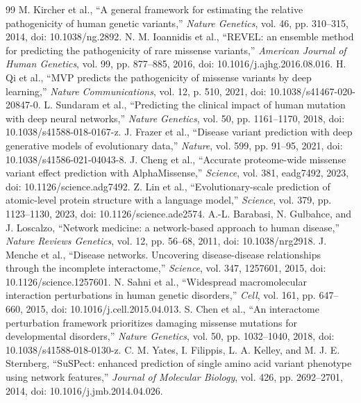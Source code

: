 \documentclass[conference]{IEEEtran}
\begin{document}
\begin{thebibliography}{99}
 M. Kircher et al., ``A general framework for estimating the relative pathogenicity of human genetic variants,'' \emph{Nature Genetics}, vol. 46, pp. 310--315, 2014, doi: 10.1038/ng.2892.
 N. M. Ioannidis et al., ``REVEL: an ensemble method for predicting the pathogenicity of rare missense variants,'' \emph{American Journal of Human Genetics}, vol. 99, pp. 877--885, 2016, doi: 10.1016/j.ajhg.2016.08.016.
 H. Qi et al., ``MVP predicts the pathogenicity of missense variants by deep learning,'' \emph{Nature Communications}, vol. 12, p. 510, 2021, doi: 10.1038/s41467-020-20847-0.
 L. Sundaram et al., ``Predicting the clinical impact of human mutation with deep neural networks,'' \emph{Nature Genetics}, vol. 50, pp. 1161--1170, 2018, doi: 10.1038/s41588-018-0167-z.
 J. Frazer et al., ``Disease variant prediction with deep generative models of evolutionary data,'' \emph{Nature}, vol. 599, pp. 91--95, 2021, doi: 10.1038/s41586-021-04043-8.
 J. Cheng et al., ``Accurate proteome-wide missense variant effect prediction with AlphaMissense,'' \emph{Science}, vol. 381, eadg7492, 2023, doi: 10.1126/science.adg7492.
 Z. Lin et al., ``Evolutionary-scale prediction of atomic-level protein structure with a language model,'' \emph{Science}, vol. 379, pp. 1123--1130, 2023, doi: 10.1126/science.ade2574.
 A.-L. Barabasi, N. Gulbahce, and J. Loscalzo, ``Network medicine: a network-based approach to human disease,'' \emph{Nature Reviews Genetics}, vol. 12, pp. 56--68, 2011, doi: 10.1038/nrg2918.
 J. Menche et al., ``Disease networks. Uncovering disease-disease relationships through the incomplete interactome,'' \emph{Science}, vol. 347, 1257601, 2015, doi: 10.1126/science.1257601.
 N. Sahni et al., ``Widespread macromolecular interaction perturbations in human genetic disorders,'' \emph{Cell}, vol. 161, pp. 647--660, 2015, doi: 10.1016/j.cell.2015.04.013.
 S. Chen et al., ``An interactome perturbation framework prioritizes damaging missense mutations for developmental disorders,'' \emph{Nature Genetics}, vol. 50, pp. 1032--1040, 2018, doi: 10.1038/s41588-018-0130-z.
 C. M. Yates, I. Filippis, L. A. Kelley, and M. J. E. Sternberg, ``SuSPect: enhanced prediction of single amino acid variant phenotype using network features,'' \emph{Journal of Molecular Biology}, vol. 426, pp. 2692--2701, 2014, doi: 10.1016/j.jmb.2014.04.026.

\end{thebibliography}
\end{document}
